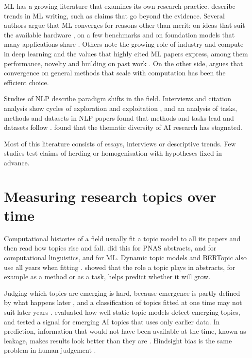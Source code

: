 ML has a growing literature that examines its own research practice. \citet{lipton2019troubling} describe trends in
ML writing, such as claims that go beyond the evidence. Several authors argue that ML converges for reasons other than
merit: on ideas that suit the available hardware \citep{hooker2021hardware}, on a few benchmarks
\citep{dehghani2021benchmark,koch2021reduced,raji2021ai} and on foundation models that many applications share
\citep{bommasani2021opportunities}. Others note the growing role of industry and compute in deep learning
\citep{ahmed2020dedemocratization,abdalla2023elephant} and the values that highly cited ML papers express, among them
performance, novelty and building on past work \citep{birhane2022values}. On the other side, \citet{sutton2019bitter}
argues that convergence on general methods that scale with computation has been the efficient choice.

Studies of NLP describe paradigm shifts in the field. Interviews and citation analysis show cycles of exploration and
exploitation \citep{gururaja2023build,saphra2024first}, and an analysis of tasks, methods and datasets in NLP papers
found that methods and tasks lead and datasets follow \citep{pramanick2023diachronic}. \citet{klinger2020narrowing}
found that the thematic diversity of AI research has stagnated.

Most of this literature consists of essays, interviews or descriptive trends. Few studies test claims of herding or
homogenisation with hypotheses fixed in advance.

\section{Measuring research topics over time}
\label{sec:lit-topics}

Computational histories of a field usually fit a topic model to all its papers and then read how topics rise and fall.
\citet{griffiths2004finding} did this for PNAS abstracts, \citet{hall2008studying} and \citet{anderson2012towards} for
computational linguistics, and \citet{schafermeier2021topic} for ML. Dynamic topic models and BERTopic also use all
years when fitting \citep{blei2006dynamic,grootendorst2022bertopic}. \citet{prabhakaran2016predicting} showed that the
role a topic plays in abstracts, for example as a method or as a task, helps predict whether it will grow.

Judging which topics are emerging is hard, because emergence is partly defined by what happens later
\citep{rotolo2015what}, and a classification of topics fitted at one time may not suit later years
\citep{leydesdorff2002dynamic}. \citet{li2025evaluation} evaluated how well static topic models detect emerging topics,
and \citet{khanbayov2026topical} tested a signal for emerging AI topics that uses only earlier data. In prediction,
information that would not have been available at the time, known as leakage, makes results look better than they are
\citep{kaufman2012leakage,kapoor2023leakage}. Hindsight bias is the same problem in human judgement
\citep{fischhoff1975hindsight}.

